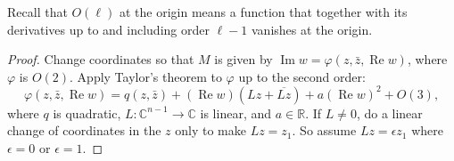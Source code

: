 \documentclass[12pt,openany]{book}
\renewcommand{\Re}{\operatorname{Re}}
\renewcommand{\Im}{\operatorname{Im}}
\newcommand{\C}{{\mathbb{C}}}
\newcommand{\R}{{\mathbb{R}}}
\theoremstyle{plain}
\theoremstyle{remark}
\theoremstyle{definition}
\theoremstyle{exercise}
\theoremstyle{example}
\begin{document}
Recall that $O(\ell)$ at the origin means
a function that together with its derivatives up to and including
order $\ell-1$ vanishes at the origin.

\begin{proof}
Change coordinates so that $M$ is given by
$\Im w = \varphi(z,\bar{z},\Re w)$,  where $\varphi$ is $O(2)$.
Apply Taylor's theorem to $\varphi$ up to the second order:
\begin{equation*}
\varphi(z,\bar{z},\Re w) = q(z,\bar{z}) + (\Re w) (Lz + \overline{Lz}) +
a {(\Re w)}^2 +
O(3) ,
\end{equation*}
where $q$ is quadratic, $L \colon \C^{n-1} \to \C$ is linear, and $a \in \R$.
If $L \neq 0$,
do a linear change of coordinates in the $z$ only to make $Lz = z_1$.
So assume $Lz = \epsilon z_1$ where $\epsilon = 0$ or $\epsilon = 1$.


\end{proof}
\end{document}
